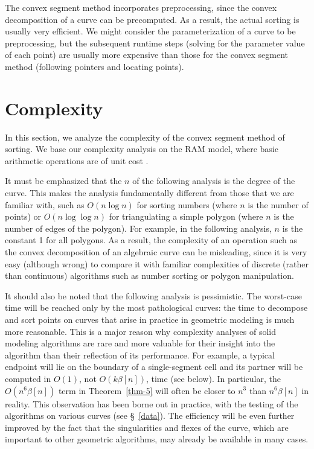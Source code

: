 The convex segment method incorporates preprocessing, since the convex 
decomposition
of a curve can be precomputed.
As a result, the actual sorting is usually very efficient.
We might consider the parameterization of a curve to be preprocessing, but
the subsequent runtime steps (solving for the parameter value of each point)
are usually more expensive than those for the convex segment 
method (following pointers
and locating points).

\section{Complexity}
\label{s-c}

In this section, we analyze the complexity of the convex segment method 
of sorting.
We base our complexity analysis on the RAM model, where basic arithmetic 
operations
are of unit cost \cite{ahu}.

It must be emphasized that the $n$ of the following analysis is the 
degree of the curve.
This makes the analysis fundamentally different from those that we
are familiar with, such as $O(n \log n)$ for sorting numbers (where
$n$ is the number of points) or $O(n \log \log n)$ for triangulating 
a simple
polygon (where $n$ is the number of edges of the polygon).
For example, in the following analysis, $n$ is the constant 1 for all 
polygons.
As a result, the complexity of an operation such as the convex 
decomposition of an
algebraic curve can be misleading, since it is very easy (although 
wrong) to 
compare it with familiar complexities of discrete (rather than 
continuous) algorithms 
such as number sorting or polygon manipulation.

It should also be noted that the following analysis is pessimistic.
The worst-case time will be reached only by the most pathological curves: 
the time to 
decompose and sort points on curves that arise in practice 
in geometric modeling is much more reasonable.
This is a major reason why complexity analyses of solid modeling 
algorithms are rare
and more valuable for their insight into the algorithm than their 
reflection of its
performance.
For example, a typical endpoint will lie on the boundary of a 
single-segment cell and its 
partner will be computed in $O(1)$, not $O(k \beta[n])$, time (see below).
In particular, the $O(n^{6}\beta[n])$ term in Theorem~\ref{thm-5} will 
often be
closer to $n^{3}$ than $n^{6}\beta[n]$ in reality.
This observation has been borne out in practice, with the testing of 
the algorithms on
various curves (see \S~\ref{data}).
The efficiency will be even further improved by the fact that the 
singularities and 
flexes of the curve, which are important to other geometric algorithms, 
may already 
be available in many cases.

